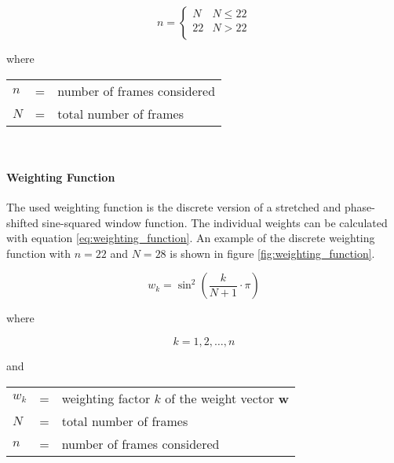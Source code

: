 \begin{equation}
  n =
  \begin{cases}
    N & N \leq 22 \\
    22 & N > 22 \\
  \end{cases}
  \label{eq:number_of_frames}
\end{equation}

where

\begin{tabular}{lll}
  $n$ & = & number of frames considered \\
  $N$ & = & total number of frames \\
\end{tabular}
\\

\paragraph{Weighting Function}
The used weighting function is the discrete version of a stretched and phase-shifted sine-squared window function.
The individual weights can be calculated with equation \ref{eq:weighting_function}.
An example of the discrete weighting function with $n = 22$ and $N = 28$ is shown in figure \ref{fig:weighting_function}.

\begin{equation}
  w_k = \sin^2\left(\frac{k}{N+1} \cdot \pi \right)
  \label{eq:weighting_function}
\end{equation}

where

\[
  k = 1, 2, \dots, n
\]

and

\begin{tabular}{lll}
  $w_k$ & = & weighting factor $k$ of the weight vector $\boldsymbol{w}$ \\
  $N$ & = & total number of frames \\
  $n$ & = & number of frames considered \\
\end{tabular}
\\

